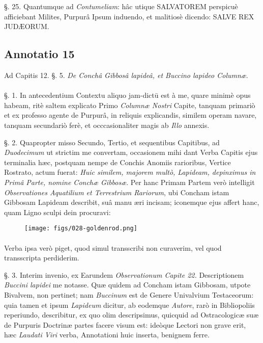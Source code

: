 \documentclass[a4paper, 11pt, oneside, polutonikogreek, german]{article}
\begin{document}
§. 25. Quantumque ad \emph{Contumeliam}: hâc utique SALVATOREM perspicuè afficiebant Milites, Purpurâ Ipsum induendo, et malitiosè dicendo: SALVE REX JUDÆORUM.

\subsection{Annotatio 15}
\begin{center}
Ad Capitis 12. §. 5. \emph{De Conchâ Gibbosâ lapideâ, et Buccino lapideo Columnæ}.
\end{center}
\paragraph{}
§. 1. In antecedentium Contextu aliquo jam-dictū est à me, quare minimè opus habeam, ritè saltem explicato Primo \emph{Columnæ Nostri} Capite, tanquam primariò et ex professo agente de Purpurâ, in reliquis explicandis, similem operam navare, tanquam secundariò ferè, et occcasionaliter magis ab \emph{Illo} annexis.

§. 2. Quapropter misso Secundo, Tertio, et sequentibus Capitibus, ad \emph{Duodecimum} ut strictim me convertam, occasionem mihi dant Verba Capitis ejus terminalia hæc, postquam nempe de Conchis Anomiis rarioribus, Vertice Rostrato, actum fuerat: \emph{Huic similem, majorem multò, Lapideam, depinximus in Primâ Parte, nomine Conchæ Gibbosæ}. Per hanc Primam Partem verò intelligit \emph{Observationes Aquatilium et Terrestrium Rariorum}, ubi Concham istam Gibbosam Lapideam describit, suâ manu æri incisam; iconemque ejus affert hanc, quam Ligno sculpi dein procuravi:

\begin{figure}[H]
\centering
\texttt{[image: figs/028-goldenrod.png]}
\end{figure}
\paragraph{}
Verba ipsa verò piget, quod simul transscribi non curaverim, vel quod transscripta perdiderim.

§. 3. Interim invenio, ex Earundem \emph{Observationum Capite 22.} Descriptionem \emph{Buccini lapidei} me notasse. Quæ quidem ad Concham istam Gibbosam, utpote Bivalvem, non pertinet; nam \emph{Buccinum} est de Genere Univalvium Testaceorum: quia tamen et ipsum \emph{Lapideum} dicitur, ab eodemque \emph{Autore}, rarò in Bibliopoliis reperiundo, describitur, ex quo olim descripsimus, quicquid ad Ostracologicæ suæ de Purpuris Doctrinæ partes facere visum est: ideòque Lectori non grave erit, hæc \emph{Laudati Viri} verba, Annotationi huic inserta, benignem ferre.
\end{document}
